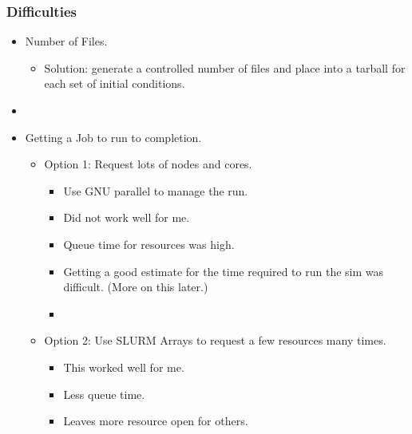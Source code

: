 \documentclass[10pt]{beamer}
\begin{document}
\begin{frame}
  \frametitle{Difficulties}
  \begin{itemize}
    \item Number of Files.
      \begin{itemize} 
        \item Solution: generate a controlled number of files and place into a
          tarball for each set of initial conditions.
      \end{itemize}

    \item[]

    \item Getting a Job to run to completion.
      \begin{itemize}
        \item Option 1: Request lots of nodes and cores.
          \begin{itemize}
            \item Use GNU parallel to manage the run.
            \item Did not work well for me.
            \item Queue time for resources was high.
            \item Getting a good estimate for the time required to run the sim
              was difficult. (More on this later.)
            \item[]
          \end{itemize}
        \item Option 2: Use SLURM Arrays to request a few resources many times.
          \begin{itemize}
            \item This worked well for me.
            \item Less queue time.
            \item Leaves more resource open for others.
          \end{itemize}
      \end{itemize}
  \end{itemize}
\end{frame}
\end{document}
